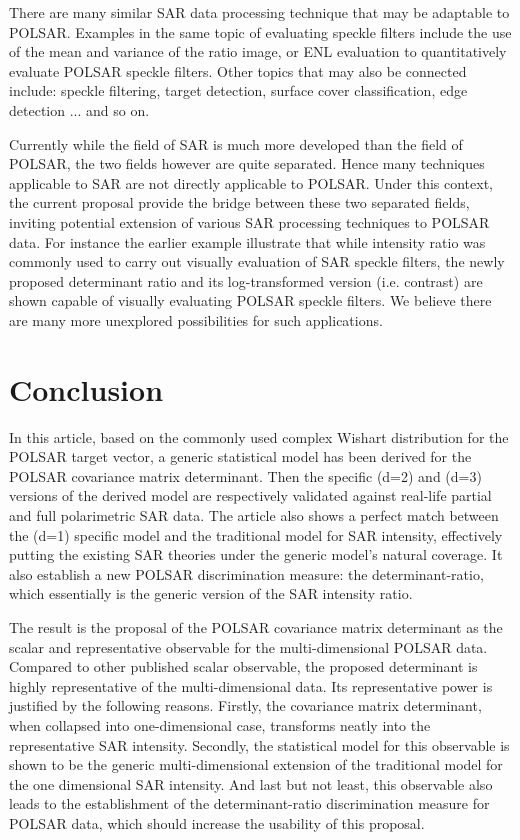 \documentclass[journal]{IEEEtran}
\begin{document}
There are many similar SAR data processing technique that may be adaptable to POLSAR.
Examples in the same topic of evaluating speckle filters include
  the use of the mean and variance of the ratio image, or ENL evaluation to quantitatively evaluate POLSAR speckle filters.
Other topics that may also be connected include: speckle filtering, target detection, surface cover classification, edge detection ... and so on.

Currently while the field of SAR is much more developed than the field of POLSAR,
  the two fields however are quite separated.
Hence many techniques applicable to SAR are not directly applicable to POLSAR.
Under this context, the current proposal provide the bridge between these two separated fields,
  inviting potential extension of various SAR processing techniques to POLSAR data.
For instance the earlier example illustrate that while intensity ratio was commonly used to carry out visually evaluation of SAR speckle filters,
  the newly proposed determinant ratio and its log-transformed version (i.e. contrast) are shown capable of visually evaluating POLSAR speckle filters.
We believe there are many more unexplored possibilities for such applications.
  
\section{Conclusion}
\label{sec:conclusion}

In this article,
  based on the commonly used complex Wishart distribution for the POLSAR target vector,
  a generic statistical model has been derived for the POLSAR covariance matrix determinant.
Then the specific (d=2) and (d=3) versions of the derived model are respectively validated against real-life partial and full polarimetric SAR data.
The article also shows a perfect match between the (d=1) specific model and the traditional model for SAR intensity,
  effectively putting the existing SAR theories under the generic model's natural coverage.
It also establish a new POLSAR discrimination measure: the determinant-ratio,
  which essentially is the generic version of the SAR intensity ratio.

The result is the proposal of the POLSAR covariance matrix determinant as the scalar and representative observable for the multi-dimensional POLSAR data.
Compared to other published scalar observable, the proposed determinant is highly representative of the multi-dimensional data.
Its representative power is justified by the following reasons.
Firstly, the covariance matrix determinant, when collapsed into one-dimensional case, transforms neatly into the representative SAR intensity.
Secondly, the statistical model for this observable is shown to be the generic multi-dimensional extension of the traditional model for the one dimensional SAR intensity.
And last but not least, this observable also leads to the establishment of the determinant-ratio discrimination measure for POLSAR data, which should increase the usability of this proposal.
\end{document}
